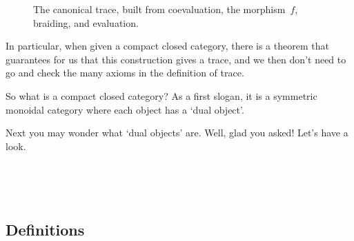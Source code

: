 \begin{figure}[h!]
    \caption{The canonical trace, built from coevaluation, the morphism~$f$, braiding, and evaluation.}
    \label{fig:canonical-trace-construction}
\end{figure}


In particular, when given a compact closed category, there is a theorem that guarantees for us that this construction gives a trace, and we then don't need to go and check the many axioms in the definition of trace. 

So what is a compact closed category? As a first slogan, it is a symmetric monoidal category where each object has a `dual object'. 

Next you may wonder what `dual objects' are. Well, glad you asked! Let's have a look. 


\



\

\subsection{Definitions}

